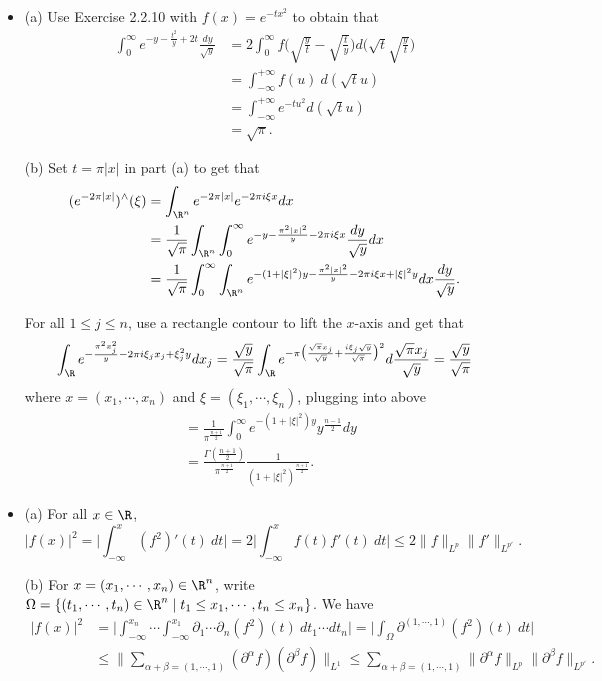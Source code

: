 \begin{itemize}
\item[2.2.11]

(a) Use Exercise 2.2.10 with $f(x)=e^{-tx^2}$ to obtain that
\begin{align*}
    \int_0^\infty e^{-y-\frac{t^2}{y}+2t}\frac{dy}{\sqrt{y}}
    &=2\int_0^\infty f\Big(\sqrt{\frac{y}{t}}-\sqrt{\frac{t}{y}}\Big)d\Big(\sqrt{t}\sqrt{\frac{y}{t}}\Big)\\
    &=\int_{-\infty}^{+\infty}f(u)\>d(\sqrt{t}u)\\
    &=\int_{-\infty}^{+\infty}e^{-tu^2}d(\sqrt{t}u)\\
    &=\sqrt{\pi}.
\end{align*}

(b) Set $t=\pi|x|$ in part (a) to get that
\begin{align*}
    (e^{-2\pi|x|})^\wedge(\xi)
    &=\int_{\R^n}e^{-2\pi|x|}e^{-2\pi i\xi x}dx\\
    &=\frac{1}{\sqrt{\pi}}\int_{\R^n}\int_0^\infty e^{-y-\frac{\pi^2|x|^2}{y}-2\pi i\xi x}\frac{dy}{\sqrt{y}}dx\\
    &=\frac{1}{\sqrt{\pi}}\int_0^\infty\int_{\R^n} e^{-(1+|\xi|^2)y-\frac{\pi^2|x|^2}{y}-2\pi i\xi x+|\xi|^2y}dx\frac{dy}{\sqrt{y}}.
\end{align*}

For all $1\leq j\leq n$, use a rectangle contour to lift the $x$-axis and get that
$$\int_\R e^{-\frac{\pi^2x_j^2}{y}-2\pi i\xi_j x_j+\xi_j^2y}dx_j
=\frac{\sqrt{y}}{\sqrt{\pi}}\int_\R e^{-\pi\big(\frac{\sqrt{\pi}x_j}{\sqrt{y}}+\frac{i\xi_j\sqrt{y}}{\sqrt{\pi}}\big)^2}d\frac{\sqrt{\pi}x_j}{\sqrt{y}}=\frac{\sqrt{y}}{\sqrt{\pi}}$$ where $x=(x_1,\cdots,x_n)$ and $\xi=(\xi_1,\cdots,\xi_n)$, plugging into above
\begin{align*}
    &=\frac{1}{\pi^{\frac{n+1}{2}}}\int_0^\infty  e^{-(1+|\xi|^2)y}y^{\frac{n-1}{2}}dy\\
    &=\frac{\varGamma(\frac{n+1}{2})}{\pi^\frac{n+1}{2}}\frac{1}{(1+|\xi|^2)^{\frac{n+1}{2}}}.
\end{align*}

\item[2.2.12]

(a) For all $x\in\R$,
$$|f(x)|^2=\bigg|\int_{-\infty}^x (f^2)'(t)\>dt\bigg|=2\bigg|\int_{-\infty}^x f(t)f'(t)\>dt\bigg|\leq2\|f\|_{L^p}\|f'\|_{L^{p'}}.$$

(b) For $x=(x_1,\cdots,x_n)\in\R^n$, write $\Omega=\{(t_1,\cdots,t_n)\in\R^n\mid t_1\leq x_1,\cdots,t_n\leq x_n \}$. We have
\begin{align*}
    |f(x)|^2
    &=\bigg|\int_{-\infty}^{x_n}\cdots\int_{-\infty}^{x_1}\partial_1\cdots\partial_n(f^2)(t)\>dt_1\cdots dt_n\bigg|
    =\bigg|\int_\Omega\partial^{(1,\cdots,1)}(f^2)(t)\>dt\bigg|\\
    &\leq\|\!\!\!\!\sum_{\alpha+\beta=(1,\cdots,1)}\!\!\!\!(\partial^\alpha f)(\partial^\beta f)\|_{L^1}
    \leq\!\!\!\!\sum_{\alpha+\beta=(1,\cdots,1)}\!\!\!\!\|\partial^\alpha f\|_{L^p}\|\partial^\beta f\|_{L^{p'}}.
\end{align*}


\end{itemize}
